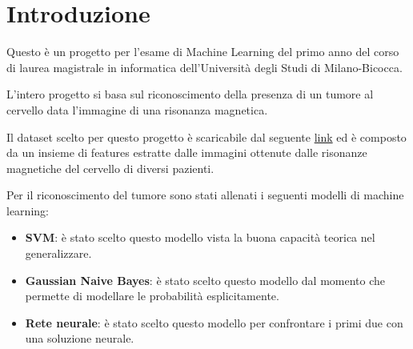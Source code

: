 \chapter{Introduzione}

Questo è un progetto per l'esame di Machine Learning del primo anno del corso 
di laurea magistrale in informatica dell'Università degli Studi di Milano-Bicocca.

L'intero progetto si basa sul riconoscimento della presenza di un tumore al cervello
data l'immagine di una risonanza magnetica.

Il dataset scelto per questo progetto è scaricabile dal seguente 
\href{https://www.kaggle.com/datasets/jakeshbohaju/brain-tumor/data}{link} ed è
composto da un insieme di features estratte dalle immagini ottenute dalle risonanze 
magnetiche del cervello di diversi pazienti.

Per il riconoscimento del tumore sono stati allenati i seguenti modelli di machine
learning:
\begin{itemize}
    \item \textbf{SVM}: è stato scelto questo modello vista la buona capacità
    teorica nel generalizzare.
    \item \textbf{Gaussian Naive Bayes}: è stato scelto questo modello dal momento
    che permette di modellare le probabilità esplicitamente.
    \item \textbf{Rete neurale}: è stato scelto questo modello per confrontare 
    i primi due con una soluzione neurale.
\end{itemize}

